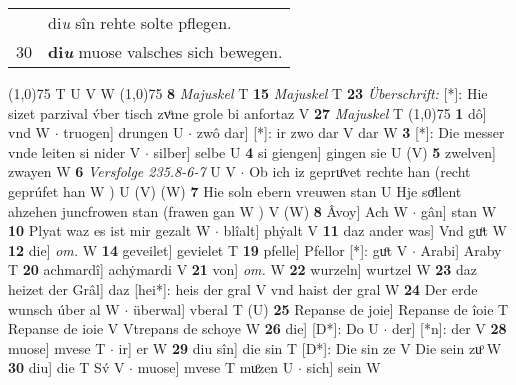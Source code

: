 \documentclass[8pt,a4paper,notitlepage]{article}
\begin{document}
\begin{table}[ht]
\begin{minipage}[t]{0.5\linewidth}
\begin{tabular}{rl}
 & di\textit{u} sîn rehte solte pflegen.\\ 
30 & \textbf{di\textit{u}} muose valsches sich bewegen.\\ 
\end{tabular}
\scriptsize
\line(1,0){75} \newline
T U V W \newline
\line(1,0){75} \newline
\textbf{8} \textit{Majuskel} T  \textbf{15} \textit{Majuskel} T  \textbf{23} \textit{Überschrift:} [*]: Hie sizet parzival v́ber tisch zvͦme grole bi anfortaz V  \textbf{27} \textit{Majuskel} T  \newline
\line(1,0){75} \newline
\textbf{1} dô] vnd W  $\cdot$ truogen] drungen U  $\cdot$ zwô dar] [*]: ir zwo dar V dar W \textbf{3} [*]: Die messer vnde leiten si nider V  $\cdot$ silber] selbe U \textbf{4} si giengen] gingen sie U (V) \textbf{5} zwelven] zwayen W \textbf{6} \textit{Versfolge 235.8-6-7} U V   $\cdot$ Ob ich iz gepruͦvet rechte han (recht geprúfet han W ) U (V) (W) \textbf{7} Hie soln ebern vreuwen stan U Hje soͤllent ahzehen juncfrowen stan (frawen gan W ) V (W) \textbf{8} Âvoy] Ach W  $\cdot$ gân] stan W \textbf{10} Plyat waz es ist mir gezalt W  $\cdot$ blîalt] phẏalt V \textbf{11} daz ander was] Vnd guͦt W \textbf{12} die] \textit{om.} W \textbf{14} geveilet] gevielet T \textbf{19} pfelle] Pfellor [*]: guͦt V  $\cdot$ Arabi] Araby T \textbf{20} achmardî] achẏmardi V \textbf{21} von] \textit{om.} W \textbf{22} wurzeln] wurtzel W \textbf{23} daz heizet der Grâl] daz [hei*]: heis der gral V vnd haist der gral W \textbf{24} Der erde wunsch úber al W  $\cdot$ überwal] vberal T (U) \textbf{25} Repanse de joie] Repanse de îoie T Repanse de ioie V Vtrepans de schoye W \textbf{26} die] [D*]: Do U  $\cdot$ der] [*n]: der V \textbf{28} muose] mvese T  $\cdot$ ir] er W \textbf{29} diu sîn] die sin T [D*]: Die sin ze V Die sein zuͦ W \textbf{30} diu] die T Sv́ V  $\cdot$ muose] mvese T muͦzen U  $\cdot$ sich] sein W \newline
\end{minipage}
\end{table}
\end{document}

